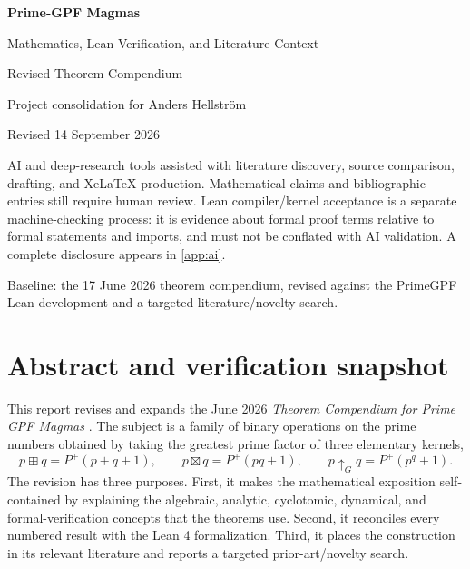 \documentclass[11pt,a4paper,oneside,open=any,headings=small]{scrbook}
\theoremstyle{definition}
\newcommand{\GPF}{P^{+}}
\newcommand{\gexp}{\mathbin{\uparrow_{G}}}
\begin{document}
\frontmatter

\begin{titlepage}
\centering
\vspace*{14mm}
{\sffamily\bfseries\Huge Prime-GPF Magmas\par}
\vspace{3mm}
{\sffamily\Large Mathematics, Lean Verification, and Literature Context\par}
\vspace{5mm}
{\Large Revised Theorem Compendium\par}
\vspace{12mm}
{\large Project consolidation for Anders Hellström\par}
\vspace{4mm}
{\large Revised 14 September 2026\par}
\vfill
\begin{tcolorbox}[width=.92\textwidth,colback=red!3,colframe=AlertRed,boxrule=1.2pt,title={\large AI-ASSISTED REPORT --- READ THIS NOTICE},fonttitle=\bfseries]
AI and deep-research tools assisted with literature discovery, source comparison, drafting, and XeLaTeX production. Mathematical claims and bibliographic entries still require human review. Lean compiler/kernel acceptance is a separate machine-checking process: it is evidence about formal proof terms relative to formal statements and imports, and must not be conflated with AI validation. A complete disclosure appears in \cref{app:ai}.
\end{tcolorbox}
\vfill
{\small Baseline: the 17 June 2026 theorem compendium, revised against the PrimeGPF Lean development and a targeted literature/novelty search.}
\end{titlepage}

\chapter*{Abstract and verification snapshot}
This report revises and expands the June 2026 \emph{Theorem Compendium for Prime GPF Magmas} \parencite{OriginalCompendium}. The subject is a family of binary operations on the prime numbers obtained by taking the greatest prime factor of three elementary kernels,
\[
 p\boxplus q=\GPF(p+q+1),\qquad
 p\boxtimes q=\GPF(pq+1),\qquad
 p\gexp q=\GPF(p^q+1).
\]
The revision has three purposes. First, it makes the mathematical exposition self-contained by explaining the algebraic, analytic, cyclotomic, dynamical, and formal-verification concepts that the theorems use. Second, it reconciles every numbered result with the Lean 4 formalization. Third, it places the construction in its relevant literature and reports a targeted prior-art/novelty search.
\end{document}
